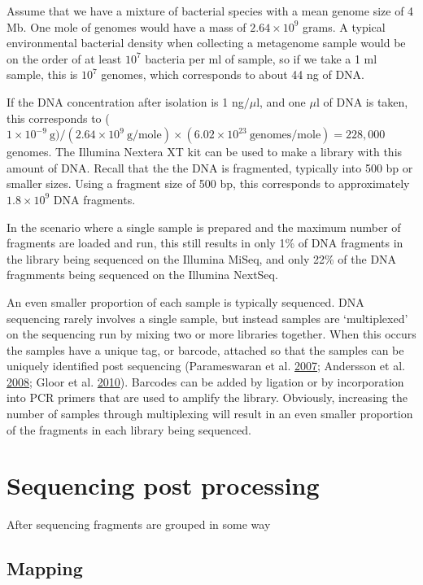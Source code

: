 \documentclass[onecolumn]{book}
\theoremstyle{definition}
\theoremstyle{definition}
\theoremstyle{definition}
\theoremstyle{remark}
\begin{document}
Assume that we have a mixture of bacterial species with a mean genome
size of 4 Mb. One mole of genomes would have a mass of
\(2.64 \times 10^9\) grams. A typical environmental bacterial density
when collecting a metagenome sample would be on the order of at least
\(10^7\) bacteria per ml of sample, so if we take a 1 ml sample, this is
\(10^7\) genomes, which corresponds to about 44 ng of DNA.

If the DNA concentration after isolation is 1 ng\(/ \mu\)l, and one
\(\mu\)l of DNA is taken, this corresponds to
(\(1\times 10^{-9} \mathrm{\ g}) / (2.64 \times 10^9\ \mathrm{g/mole}) \times (6.02 \times 10^{23} \mathrm{\ genomes/mole}) = 228,000\)
genomes. The Illumina Nextera XT kit can be used to make a library with
this amount of DNA. Recall that the the DNA is fragmented, typically
into 500 bp or smaller sizes. Using a fragment size of 500 bp, this
corresponds to approximately \(1.8 \times 10^9\) DNA fragments.

In the scenario where a single sample is prepared and the maximum number
of fragments are loaded and run, this still results in only 1\% of DNA
fragments in the library being sequenced on the Illumina MiSeq, and only
22\% of the DNA fragmments being sequenced on the Illumina NextSeq.

An even smaller proportion of each sample is typically sequenced. DNA
sequencing rarely involves a single sample, but instead samples are
`multiplexed' on the sequencing run by mixing two or more libraries
together. When this occurs the samples have a unique tag, or barcode,
attached so that the samples can be uniquely identified post sequencing
(Parameswaran et al. \protect\hyperlink{ref-Parameswaran:2007aa}{2007};
Andersson et al. \protect\hyperlink{ref-Andersson:2008}{2008}; Gloor et
al. \protect\hyperlink{ref-Gloor:2010}{2010}). Barcodes can be added by
ligation or by incorporation into PCR primers that are used to amplify
the library. Obviously, increasing the number of samples through
multiplexing will result in an even smaller proportion of the fragments
in each library being sequenced.

\hypertarget{sequencing-post-processing}{%
\section{Sequencing post processing}\label{sequencing-post-processing}}

After sequencing fragments are grouped in some way

\hypertarget{mapping}{%
\subsection{Mapping}\label{mapping}}
\end{document}
